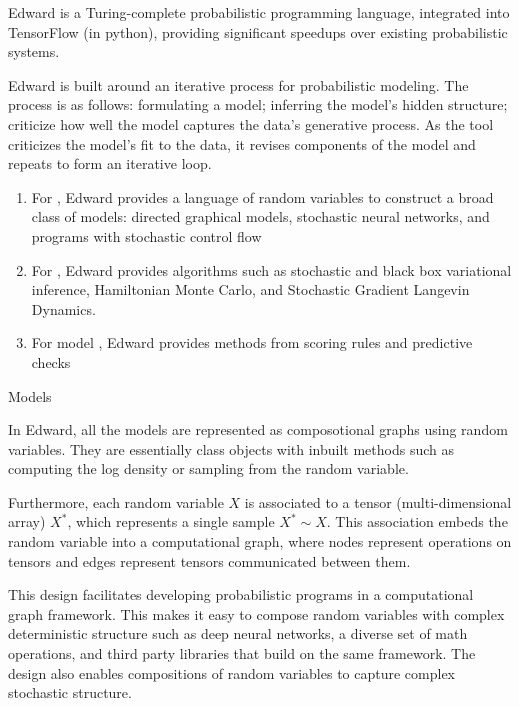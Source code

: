 \documentclass{article}
\begin{document}
\begin{question}

	Edward is a Turing-complete probabilistic programming language, integrated into TensorFlow (in python), providing significant speedups over existing probabilistic systems.

	Edward is built around an iterative process for probabilistic modeling.
	The process is as follows: formulating a model; inferring the model’s hidden structure; criticize how well the model captures the data’s generative process.
	As the tool criticizes the model’s fit to the data, it revises components of the model and repeats to form an iterative loop.

	\begin{enumerate}
		\item For , Edward provides a language of random variables to construct a broad class of models: directed graphical models, stochastic neural networks, and programs with stochastic control flow
		\item For , Edward provides algorithms such as stochastic and black box variational inference, Hamiltonian Monte Carlo, and Stochastic Gradient Langevin Dynamics.
		\item For model , Edward provides methods from scoring rules and predictive checks
	\end{enumerate}

	\begin{qsection}{Models}

		In Edward, all the models are represented as composotional graphs using random variables.
		They are essentially class objects with inbuilt methods such as computing the log density or sampling from the random variable.

		Furthermore, each random variable $X$ is associated to a tensor (multi-dimensional array) $X^\ast$, which represents a single sample $X^\ast ∼ X$.
		This association embeds the random variable into a computational graph, where nodes represent operations on tensors and edges represent tensors communicated between them.

		This design facilitates developing probabilistic programs in a computational graph framework.
		This makes it easy to compose random variables with complex deterministic structure such as deep neural networks, a diverse set of math operations, and third party libraries that build on the same framework.
		The design also enables compositions of random variables to capture complex stochastic structure.


\end{qsection}
\end{question}
\end{document}
